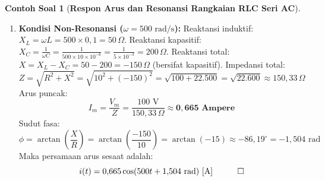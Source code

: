 \documentclass[11pt,a4paper]{article}
\theoremstyle{definition}
\newtheorem{example}{Contoh Soal}[section]
\begin{document}
\begin{example}[\textbf{Respon Arus dan Resonansi Rangkaian RLC Seri AC}]
\begin{enumerate}[label=(\alph*), leftmargin=*]
    \item \textbf{Kondisi Non-Resonansi ($\omega = 500\text{ rad/s}$):}
    Reaktansi induktif: $X_L = \omega L = 500 \times 0{,}1 = 50\,\Omega$.
    Reaktansi kapasitif: $X_C = \frac{1}{\omega C} = \frac{1}{500 \times 10 \times 10^{-6}} = \frac{1}{5 \times 10^{-3}} = 200\,\Omega$.
    Reaktansi total: $X = X_L - X_C = 50 - 200 = -150\,\Omega$ (bersifat kapasitif).
    Impedansi total:
    \begin{equation*}
        Z = \sqrt{R^2 + X^2} = \sqrt{10^2 + (-150)^2} = \sqrt{100 + 22.500} = \sqrt{22.600} \approx 150{,}33\,\Omega
    \end{equation*}
    Arus puncak:
    \begin{equation*}
        I_m = \frac{V_m}{Z} = \frac{100\text{ V}}{150{,}33\,\Omega} \approx \mathbf{0{,}665\text{ Ampere}}
    \end{equation*}
    Sudut fasa:
    \begin{equation*}
        \phi = \arctan\left(\frac{X}{R}\right) = \arctan\left(\frac{-150}{10}\right) = \arctan(-15) \approx -86{,}19^\circ = -1{,}504\text{ rad}
    \end{equation*}
    Maka persamaan arus sesaat adalah:
    \begin{equation*}
        i(t) = 0{,}665 \cos(500 t + 1{,}504\text{ rad})\text{ [A]} \quad \qed
    \end{equation*}
\end{enumerate}
\end{example}
\end{document}
